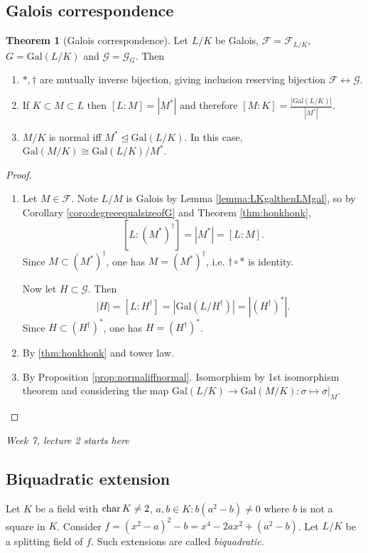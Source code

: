 \documentclass[a4paper]{article}
\newcommand{\gal}{\text{Gal}}
\newcommand{\Char}{\text{char\,}}
\theoremstyle{definition}
\newtheorem{thm}[defn]{Theorem}
\begin{document}
\subsection{Galois correspondence}
\begin{thm}[Galois correspondence]
\label{thm:galoiscorr}
Let $L/K$ be Galois, $\mathcal F=\mathcal F_{L/K}$, $G=\gal(L/K)$ and $\mathcal G=\mathcal G_G$. Then
\begin{enumerate}
\item $\ast,\dagger$ are mutually inverse bijection, giving inclusion reserving bijection $\mathcal F \leftrightarrow \mathcal G$.
\item If $K\subset M\subset L$ then $[L:M]=|M^\ast|$ and therefore $[M:K]=\frac{|\gal(L/K)|}{|M^\ast|}$.
\item $M/K$ is normal iff $M^\ast\unlhd \gal(L/K)$. In this case, $\gal(M/K)\cong \gal(L/K)/M^\ast$.
\end{enumerate}
\end{thm}
\begin{proof}
\begin{enumerate}
\item Let $M\in\mathcal F$. Note $L/M$ is Galois by Lemma \ref{lemma:LKgalthenLMgal}, so by Corollary \ref{coro:degreeequalsizeofG} and Theorem \ref{thm:honkhonk},
\[
\left[L:(M^\ast)^\dagger\right]=|M^\ast|=[L:M].
\]
Since $M\subset (M^\ast)^\dagger$, one has $M=(M^\ast)^\dagger$, i.e. $\dagger\circ\ast$ is identity.

Now let $H\subset \mathcal G$. Then
\[
|H|=\left[L:H^\dagger\right]=\left|\gal\left(L/H^\dagger\right)\right|=\left|\left(H^\dagger\right)^\ast\right|.
\]
Since $H\subset \left(H^\dagger\right)^\ast$, one has $H=\left(H^\dagger\right)^\ast$.
\item By \ref{thm:honkhonk} and tower law.
\item By Proposition \ref{prop:normaliffnormal}. Isomorphism by 1st isomorphism theorem and considering the map $\gal(L/K)\rightarrow \gal(M/K):\sigma\mapsto\sigma|_M$.
\end{enumerate}
\end{proof}

\begin{flushright}
\textit{Week 7, lecture 2 starts here}
\end{flushright}

\subsection{Biquadratic extension}
Let $K$ be a field with $\Char K\neq 2$, $a,b\in K:b(a^2-b)\neq 0$ where $b$ is not a square in $K$. Consider $f=(x^2-a)^2-b=x^4-2ax^2+(a^2-b)$. Let $L/K$ be a splitting field of $f$. Such extensions are called \textit{biquadratic}.
\end{document}
